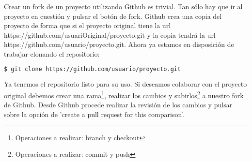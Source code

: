 Crear un fork de un proyecto utilizando Github es trivial. Tan sólo hay que ir al proyecto en cuestión y pulsar el botón de fork. Github crea una copia del proyecto de forma que si el proyecto original tiene la url https://github.com/usuariOriginal/proyecto.git y la copia tendrá la url https://github.com/usuario/proyecto.git. Ahora ya estamos en disposición de trabajar clonando el repositorio:

\begin{lstlisting}[language=bash, numbers=none]
$ git clone https://github.com/usuario/proyecto.git
\end{lstlisting}

Ya tenemos el repositorio listo para su uso. Si deseamos colaborar con el proyecto original debemos crear una rama\footnote{Operaciones a realizar: branch y checkout}, realizar los cambios y subirlos\footnote{Operaciones a realizar: commit y push} a nuestro fork de Github.  Desde Github procede realizar la revisión de los cambios y pulsar sobre la opción de 'create a pull request for this comparison'.

